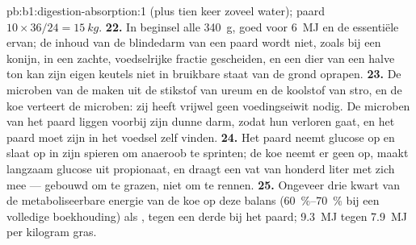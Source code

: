 \begin{solution}{pb:b1:digestion-absorption:1}
(plus tien keer zoveel water); paard $10\times 36/24 =
\qty{15}{kg}$.
\textbf{22.} In beginsel alle \qty{340}{g}, goed voor \qty{6}{MJ} en de
essentiële  ervan; de inhoud van de blindedarm van een paard
wordt niet, zoals bij een konijn, in een zachte, voedselrijke fractie
gescheiden, en een dier van een halve ton kan zijn eigen keutels niet in
bruikbare staat van de grond oprapen.
\textbf{23.} De microben van de  maken  uit de stikstof van ureum
en de koolstof van stro, en de koe verteert de microben: zij heeft vrijwel
geen voedingseiwit nodig. De microben van het paard liggen voorbij zijn
dunne darm, zodat hun  verloren gaat, en het paard moet zijn
 in het voedsel zelf vinden.
\textbf{24.} Het paard neemt glucose op en slaat  op in zijn
spieren om anaeroob te sprinten; de koe neemt er geen op, maakt langzaam
glucose uit propionaat, en draagt een vat van honderd liter met zich mee
--- gebouwd om te grazen, niet om te rennen.
\textbf{25.} Ongeveer drie kwart van de metaboliseerbare energie van de koe
op deze balans (\qtyrange{60}{70}{\%} bij een volledige boekhouding) als
, tegen een derde bij het paard; \qty{9.3}{MJ} tegen
\qty{7.9}{MJ} per kilogram gras.
\end{solution}
